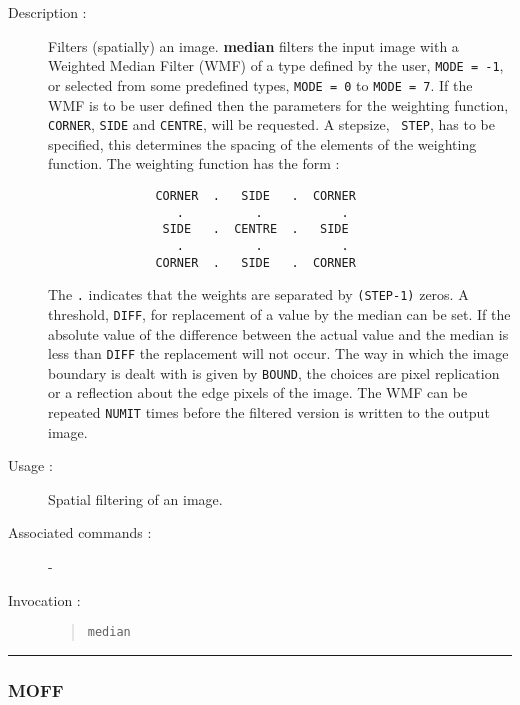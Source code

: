 \begin{description}

\item[Description :] Filters (spatially) an image.  {\bf median}
filters the input image with a Weighted Median Filter (WMF) of a type
defined by the user, {\tt MODE = -1}, or selected from some predefined
types, {\tt MODE = 0} to {\tt MODE = 7}.  If the WMF is to be user
defined then the parameters for the weighting function, {\tt CORNER},
{\tt SIDE} and {\tt CENTRE}, will be requested.  A stepsize, {\tt
STEP}, has to be specified, this determines the spacing of the elements
of the weighting function. The weighting function has the form :

\begin{small}
\begin{verbatim}
               CORNER  .   SIDE   .  CORNER
                  .          .           .
                SIDE   .  CENTRE  .   SIDE
                  .          .           .
               CORNER  .   SIDE   .  CORNER
\end{verbatim}
\end{small}

The {\tt .} indicates that the weights are separated by {\tt (STEP-1)}
zeros. A threshold, {\tt DIFF}, for replacement of a value by the
median can be set. If the absolute value of the difference between the
actual value and the median is less than {\tt DIFF} the replacement
will not occur.  The way in which the image boundary is dealt with is
given by {\tt BOUND}, the choices are pixel replication or a reflection
about the edge pixels of the image. The WMF can be repeated {\tt NUMIT}
times before the filtered version is written to the output image.

\item[Usage :] Spatial filtering of an image.
\item[Associated commands :] -
\item[Invocation :]

\begin{quote}{\tt  median }\end{quote}

\end{description}

\hrule 
\subsubsection*{\label{MOFF}MOFF}

